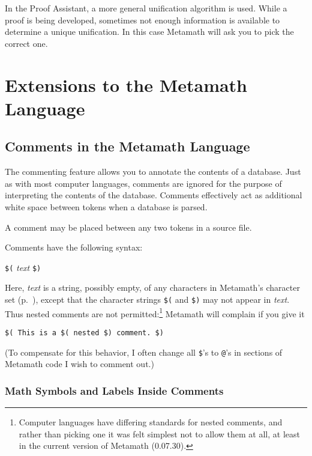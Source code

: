 In the Proof Assistant, a more general unification
algorithm is used.  While a proof is being developed, sometimes not enough
information is available to determine a unique unification.  In this case
Metamath will ask you to pick the correct one.

\section{Extensions to the Metamath Language}

\subsection{Comments in the Metamath Language}\label{comments}

The commenting feature allows you to annotate the contents of
a database.  Just as with most
computer languages, comments are ignored for the purpose of interpreting the
contents of the database. Comments effectively act as
additional white space between tokens
when a database is parsed.

A comment may be placed between any two tokens in a source
file.

Comments have the following syntax:
\begin{center}
 \texttt{\$(} {\em text} \texttt{\$)}
\end{center}
Here, {\em text} is a string, possibly empty, of any
characters in Metamath's character set (p.~\pageref{spec1chars}), except
that the character strings \texttt{\$(} and \texttt{\$)} may not appear
in {\em text}.  Thus nested comments are not
permitted:\footnote{Computer languages have differing standards for
nested comments, and rather than picking one it was felt simplest not to
allow them at all, at least in the current version of Metamath
(0.07.30).} Metamath will
complain if you give it
\begin{center}
 \texttt{\$( This is a \$( nested \$) comment.\ \$)}
\end{center}
(To compensate for this behavior, I often change all \texttt{\$}'s to
\texttt{@}'s in sections of Metamath code I wish to comment out.)

\subsubsection{Math Symbols and Labels Inside Comments}
\label{mathcomments}

